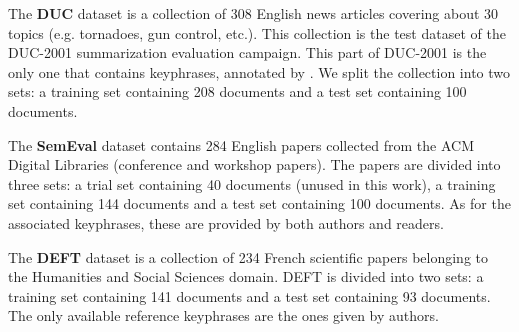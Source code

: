     The \textbf{DUC} dataset \cite{over2001duc} is a collection of 308 English
    news articles covering about 30 topics (e.g. tornadoes, gun control, etc.).
    This collection is the test dataset of the DUC-2001 summarization evaluation
    campaign. This part of DUC-2001 is the only one that contains keyphrases,
    annotated by . We split the collection into two
    sets: a training set containing 208 documents and a test set containing 100
    documents.

    The \textbf{SemEval} dataset \cite{kim2010semeval} contains 284 English
    papers collected from the ACM Digital Libraries (conference and workshop
    papers). The papers are divided into three sets: a trial set containing 40
    documents (unused in this work), a training set containing 144 documents and
    a test set containing 100 documents. As for the associated keyphrases, these
    are provided by both authors and readers.

    The \textbf{DEFT} dataset \cite{Paroubek2012deft} is a collection of 234
    French scientific papers belonging to the Humanities and Social Sciences
    domain. DEFT is divided into two sets: a training set containing 141
    documents and a test set containing 93 documents. The only available
    reference keyphrases are the ones given by authors.

